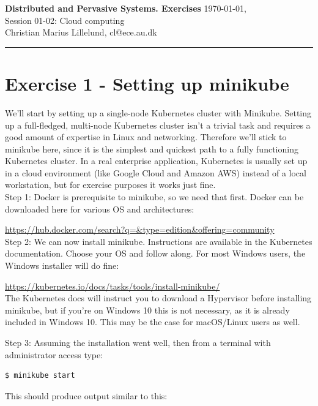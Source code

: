 \documentclass[a4paper,10pt]{article}
\begin{document}
	
\textbf{Distributed and Pervasive Systems. Exercises} \hfill \today, \currenttime\\
Session 01-02: Cloud computing\\
Christian Marius Lillelund, cl@ece.au.dk\\
\hrule

\section{Exercise 1 - Setting up minikube}
		
We'll start by setting up a single-node Kubernetes cluster with Minikube. Setting up a full-fledged, multi-node Kubernetes cluster isn't a trivial task and requires a good amount of expertise in Linux and networking. Therefore we'll stick to minikube here, since it is the simplest and quickest path to a fully functioning Kubernetes cluster. In a real enterprise application, Kubernetes is usually set up in a cloud environment (like Google Cloud and Amazon AWS) instead of a local workstation, but for exercise purposes it works just fine. \\

Step 1: Docker is prerequisite to minikube, so we need that first. Docker can be downloaded here for various OS and architectures:

\url{https://hub.docker.com/search?q=&type=edition&offering=community} \\

Step 2: We can now install minikube. Instructions are available in the Kubernetes documentation. Choose your OS and follow along. For most Windows users, the Windows installer will do fine:

\url{https://kubernetes.io/docs/tasks/tools/install-minikube/} \\

The Kubernetes docs will instruct you to download a Hypervisor before installing minikube, but if you're on Windows 10 this is not necessary, as it is already included in Windows 10. This may be the case for macOS/Linux users as well.

Step 3: Assuming the installation went well, then from a terminal with administrator access type:

\begin{lstlisting}[numbers=none, basicstyle=\ttfamily]
$ minikube start
\end{lstlisting}

This should produce output similar to this:
\end{document}
